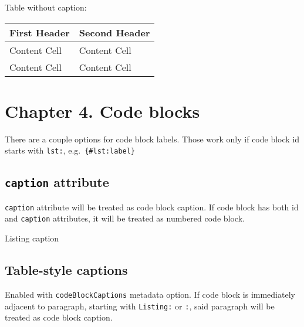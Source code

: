 Table without caption:

\begin{longtable}[]{@{}ll@{}}
\toprule()
First Header & Second Header \\
\midrule()
\endhead
Content Cell & Content Cell \\
Content Cell & Content Cell \\
\bottomrule()
\end{longtable}

\hypertarget{sec:chapter-4.-code-blocks}{%
\section{Chapter 4. Code blocks}\label{sec:chapter-4.-code-blocks}}

There are a couple options for code block labels. Those work only if code block
id starts with \texttt{lst:}, e.g.~\texttt{\{\#lst:label\}}

\hypertarget{sec:caption-attr}{%
\subsection{\texorpdfstring{\texttt{caption}
attribute}{caption attribute}}\label{sec:caption-attr}}

\texttt{caption} attribute will be treated as code block caption. If code block
has both id and \texttt{caption} attributes, it will be treated as numbered code
block.

\begin{codelisting}

\caption{Listing caption}

\hypertarget{lst:captionAttr}{%
\label{lst:captionAttr}}%
\begin{Shaded}
\begin{Highlighting}[]
 \NormalTok{ ()}
\OtherTok{=}  
\end{Highlighting}
\end{Shaded}

\end{codelisting}

\pagebreak

\hypertarget{sec:table-capts}{%
\subsection{Table-style captions}\label{sec:table-capts}}

Enabled with \texttt{codeBlockCaptions} metadata option. If code block is
immediately adjacent to paragraph, starting with \texttt{Listing:} or
\texttt{:}, said paragraph will be treated as code block caption.

